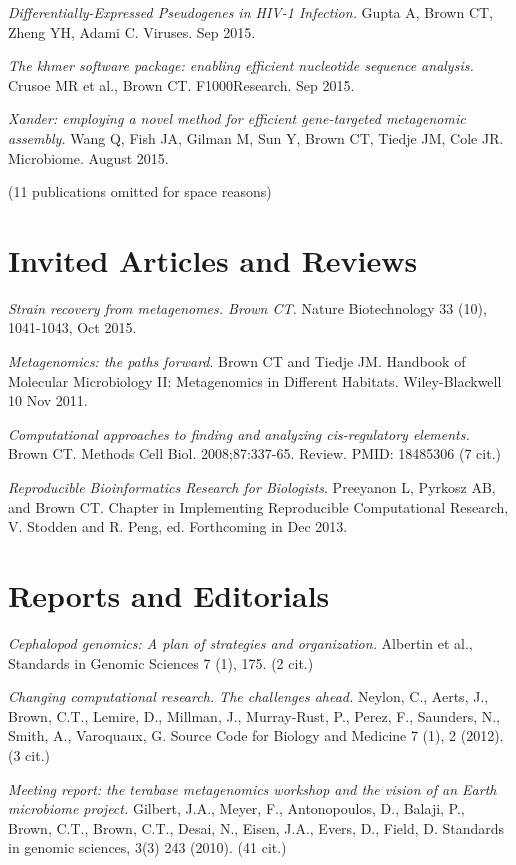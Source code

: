 \documentclass[margin,line]{resume}
\begin{document}
\begin{resume}
{\em Differentially-Expressed Pseudogenes in HIV-1 Infection.} Gupta A, Brown CT, Zheng YH, Adami C. Viruses. Sep 2015.

{\em The khmer software package: enabling efficient nucleotide sequence analysis.} Crusoe MR et al., Brown CT. F1000Research. Sep 2015.

{\em Xander: employing a novel method for efficient gene-targeted metagenomic assembly.} Wang Q, Fish JA, Gilman M, Sun Y, Brown CT, Tiedje JM, Cole JR. Microbiome. August 2015.

(11 publications omitted for space reasons)

\section{\mysidestyle Invited Articles and Reviews}

{\em Strain recovery from metagenomes. Brown CT.} Nature Biotechnology
33 (10), 1041-1043, Oct 2015.

{\em Metagenomics: the paths forward}.  Brown CT and Tiedje JM.
Handbook of Molecular Microbiology II: Metagenomics in Different
Habitats.  Wiley-Blackwell 10 Nov 2011.

{\em Computational approaches to finding and analyzing cis-regulatory elements.} 
Brown CT. Methods Cell Biol. 2008;87:337-65. Review.
PMID: 18485306  (7 cit.)

{\em Reproducible Bioinformatics Research for Biologists}.  Preeyanon
L, Pyrkosz AB, and Brown CT. Chapter in Implementing Reproducible
Computational Research, V. Stodden and R. Peng, ed.  Forthcoming in
Dec 2013.

\section{\mysidestyle Reports and Editorials}

{\em Cephalopod genomics: A plan of strategies and organization.} Albertin et al., Standards in Genomic Sciences 7 (1), 175. (2 cit.)

{\em Changing computational research. The challenges ahead.}
Neylon, C., Aerts, J., Brown, C.T., Lemire, D., Millman, J., Murray-Rust, P., Perez, F., Saunders, N., Smith, A., Varoquaux, G.
Source Code for Biology and Medicine 7 (1), 2 (2012). (3 cit.)

{\em Meeting report: the terabase metagenomics workshop and the vision of an Earth microbiome project.}
Gilbert, J.A., Meyer, F., Antonopoulos, D., Balaji, P., Brown, C.T., Brown, C.T., Desai, N., Eisen, J.A., Evers, D., Field, D. Standards in genomic sciences, 3(3) 243 (2010). (41 cit.)


\end{resume}
\end{document}

